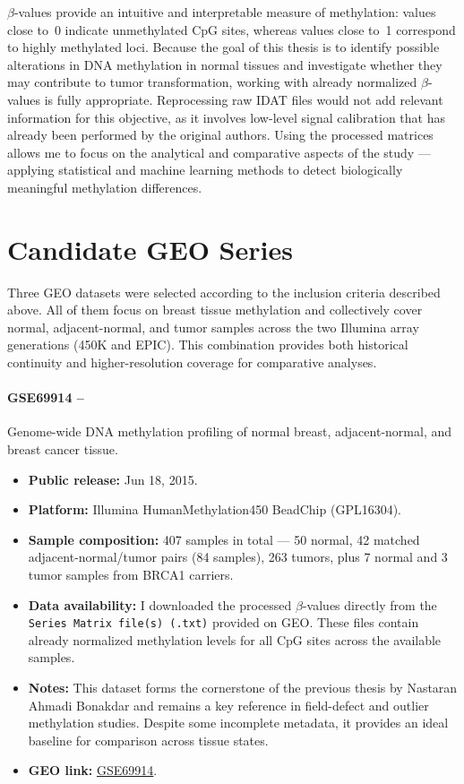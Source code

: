 \documentclass[10pt]{extarticle}
\begin{document}
$\beta$-values provide an intuitive and interpretable measure of methylation: values close to~0 indicate unmethylated CpG sites, whereas values close to~1 correspond to highly methylated loci.  
Because the goal of this thesis is to identify possible alterations in DNA methylation in normal tissues and investigate whether they may contribute to tumor transformation, working with already normalized $\beta$-values is fully appropriate.  
Reprocessing raw IDAT files would not add relevant information for this objective, as it involves low-level signal calibration that has already been performed by the original authors.  
Using the processed matrices allows me to focus on the analytical and comparative aspects of the study — applying statistical and machine learning methods to detect biologically meaningful methylation differences.


\section{Candidate GEO Series}

Three GEO datasets were selected according to the inclusion criteria described above.  
All of them focus on breast tissue methylation and collectively cover normal, adjacent-normal, and tumor samples across the two Illumina array generations (450K and EPIC).  
This combination provides both historical continuity and higher-resolution coverage for comparative analyses.

\paragraph{GSE69914 --} Genome-wide DNA methylation profiling of normal breast, adjacent-normal, and breast cancer tissue.
\begin{itemize}[label=-]
  \item \textbf{Public release:} Jun 18, 2015.
  \item \textbf{Platform:} Illumina HumanMethylation450 BeadChip (GPL16304).  
  \item \textbf{Sample composition:} 407 samples in total — 50 normal, 42 matched adjacent-normal/tumor pairs (84 samples), 263 tumors, plus 7 normal and 3 tumor samples from BRCA1 carriers.
  \item \textbf{Data availability:} I downloaded the processed $\beta$-values directly from the \texttt{Series Matrix file(s) (.txt)} provided on GEO. These files contain already normalized methylation levels for all CpG sites across the available samples.
  \item \textbf{Notes:} This dataset forms the cornerstone of the previous thesis by Nastaran Ahmadi Bonakdar \cite{Bonakdar2025} and remains a key reference in field-defect and outlier methylation studies. Despite some incomplete metadata, it provides an ideal baseline for comparison across tissue states.
  \item \textbf{GEO link:} \href{https://www.ncbi.nlm.nih.gov/geo/query/acc.cgi?acc=GSE69914}{GSE69914}.
\end{itemize}
\end{document}
